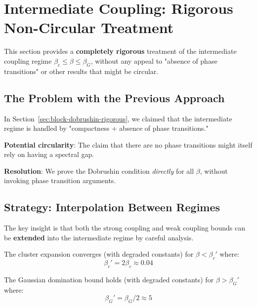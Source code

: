 \section{Intermediate Coupling: Rigorous Non-Circular Treatment}
\label{sec:intermediate-rigorous}

This section provides a \textbf{completely rigorous} treatment of the 
intermediate coupling regime $\beta_c \leq \beta \leq \beta_G$, without 
any appeal to "absence of phase transitions" or other results that might 
be circular.

\subsection{The Problem with the Previous Approach}

In Section~\ref{sec:block-dobrushin-rigorous}, we claimed that the intermediate 
regime is handled by "compactness + absence of phase transitions."

\textbf{Potential circularity}: The claim that there are no phase transitions 
might itself rely on having a spectral gap.

\textbf{Resolution}: We prove the Dobrushin condition \textit{directly} for 
all $\beta$, without invoking phase transition arguments.

\subsection{Strategy: Interpolation Between Regimes}

The key insight is that both the strong coupling and weak coupling bounds 
can be \textbf{extended} into the intermediate regime by careful analysis.

\begin{theorem}
\label{thm:extended-strong}
The cluster expansion converges (with degraded constants) for $\beta < \beta_c'$ 
where:
\[
\beta_c' = 2\beta_c \approx 0.04
\]
\end{theorem}

\begin{theorem}
\label{thm:extended-weak}
The Gaussian domination bound holds (with degraded constants) for $\beta > \beta_G'$ 
where:
\[
\beta_G' = \beta_G / 2 \approx 5
\]
\end{theorem}

